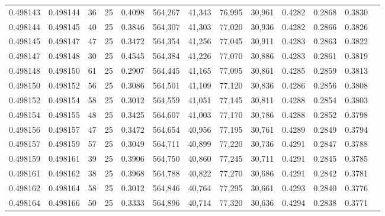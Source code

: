 \begin{tabular}{rrrrrrrrrrrrr}
0.498143 & 0.498144 &    36 &  25 &                                     0.4098 & 564,267 &  41,343 &  76,995 &  30,961 & 0.4282 & 0.2868 & 0.3830 \\
0.498144 & 0.498145 &    40 &  25 &                                     0.3846 & 564,307 &  41,303 &  77,020 &  30,936 & 0.4282 & 0.2866 & 0.3826 \\
0.498145 & 0.498147 &    47 &  25 &                                     0.3472 & 564,354 &  41,256 &  77,045 &  30,911 & 0.4283 & 0.2863 & 0.3822 \\
0.498147 & 0.498148 &    30 &  25 &                                     0.4545 & 564,384 &  41,226 &  77,070 &  30,886 & 0.4283 & 0.2861 & 0.3819 \\
0.498148 & 0.498150 &    61 &  25 &                                     0.2907 & 564,445 &  41,165 &  77,095 &  30,861 & 0.4285 & 0.2859 & 0.3813 \\
0.498150 & 0.498152 &    56 &  25 &                                     0.3086 & 564,501 &  41,109 &  77,120 &  30,836 & 0.4286 & 0.2856 & 0.3808 \\
0.498152 & 0.498154 &    58 &  25 &                                     0.3012 & 564,559 &  41,051 &  77,145 &  30,811 & 0.4288 & 0.2854 & 0.3803 \\
0.498154 & 0.498155 &    48 &  25 &                                     0.3425 & 564,607 &  41,003 &  77,170 &  30,786 & 0.4288 & 0.2852 & 0.3798 \\
0.498156 & 0.498157 &    47 &  25 &                                     0.3472 & 564,654 &  40,956 &  77,195 &  30,761 & 0.4289 & 0.2849 & 0.3794 \\
0.498157 & 0.498159 &    57 &  25 &                                     0.3049 & 564,711 &  40,899 &  77,220 &  30,736 & 0.4291 & 0.2847 & 0.3788 \\
0.498159 & 0.498161 &    39 &  25 &                                     0.3906 & 564,750 &  40,860 &  77,245 &  30,711 & 0.4291 & 0.2845 & 0.3785 \\
0.498161 & 0.498162 &    38 &  25 &                                     0.3968 & 564,788 &  40,822 &  77,270 &  30,686 & 0.4291 & 0.2842 & 0.3781 \\
0.498162 & 0.498164 &    58 &  25 &                                     0.3012 & 564,846 &  40,764 &  77,295 &  30,661 & 0.4293 & 0.2840 & 0.3776 \\
0.498164 & 0.498166 &    50 &  25 &                                     0.3333 & 564,896 &  40,714 &  77,320 &  30,636 & 0.4294 & 0.2838 & 0.3771 \\

\end{tabular}
